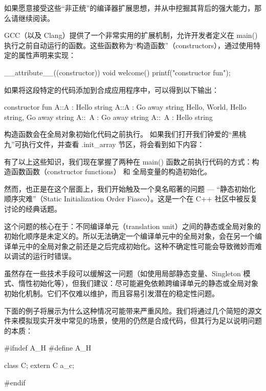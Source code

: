 如果愿意接受这些“非正统”的编译器扩展思想，并从中挖掘其背后的强大能力，那么请继续阅读。

GCC（以及 Clang）提供了一个非常实用的扩展机制，允许开发者定义在 main() 执行之前自动运行的函数。这些函数称为“构造函数”（constructors），通过使用特定的属性声明来实现：

\begin{cpp}
__attribute__((constructor)) void welcome() {
printf("constructor fun\n");
}
\end{cpp}

如果将这段特定的代码添加到合成应用程序中，可以得到以下输出：

\begin{shell}
constructor fun
A::A : Hello string
A::A : Go away string
Hello, World, Hello string, Go away string
A::~A : Go away string
A::~A : Hello string
\end{shell}

构造函数会在全局对象初始化代码之前执行。 如果我们打开我们钟爱的“黑桃九”可执行文件，并查看 .init\_array 节区，将会看到如下内容：


有了以上这些知识，我们现在掌握了两种在 main() 函数之前执行代码的方式：构造函数函数（constructor functions） 和 全局变量的构造初始化。

然而，也正是在这个层面上，我们开始触及一个臭名昭著的问题 --- “静态初始化顺序灾难”（Static Initialization Order Fiasco）。这是一个在 C++ 社区中被反复讨论的经典话题。

这个问题的核心在于：不同编译单元（translation unit）之间的静态或全局对象的初始化顺序是未定义的。所以无法确定一个编译单元中的全局对象，会在另一个编译单元中的全局对象之前还是之后完成初始化。这种不确定性可能会导致微妙而难以调试的运行时错误。

虽然存在一些技术手段可以缓解这一问题（如使用局部静态变量、Singleton 模式、惰性初始化等），但我们建议：尽可能避免依赖跨编译单元的静态或全局对象初始化机制。它们不仅难以维护，而且容易引发潜在的稳定性问题。

下面的例子将展示为什么这种情况可能带来严重风险。我们将通过几个简短的源文件来模拟现实开发中常见的场景，使用的仍然是合成代码，但其行为足以说明问题的本质：


\begin{cpp}
#ifndef A_H
#define A_H

class C;
extern C a_c;

#endif
\end{cpp}

